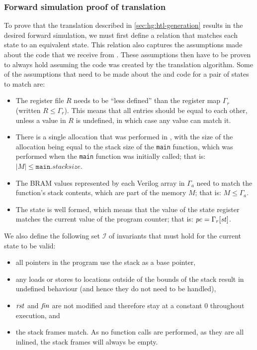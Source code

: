 \subsubsection{Forward simulation proof of translation}

To prove that the translation described in \cref{sec:hg:htl-generation} results
in the desired forward simulation, we must first define a relation that matches
each \rtlsubpar{} state to an equivalent \htl{} state.  This relation also
captures the assumptions made about the \rtlsubpar{} code that we receive from
\compcert{}.  These assumptions then have to be proven to always hold assuming
the \htl{} code was created by the translation algorithm.  Some of the
assumptions that need to be made about the \rtlsubpar{} and \htl{} code for a
pair of states to match are:

\begin{itemize}
\item The \rtlsubpar{} register file $R$ needs to be \enquote{less defined} than
  the \htl{} register map $\Gamma_{r}$ (written $R \le \Gamma_{r}$). This means
  that all entries should be equal to each other, unless a value in $R$ is
  undefined, in which case any value can match it.
\item There is a single allocation that was performed in \rtlsubpar{}, with the
  size of the allocation being equal to the stack size of the \texttt{main}
  function, which was performed when the \texttt{main} function was initially
  called; that is: $|M| \le \texttt{main}.\mathit{stacksize}$.
\item The \gls{BRAM} values represented by each Verilog array in $\Gamma_{a}$ need to
  match the \rtlsubpar{} function's stack contents, which are part of the memory $M$;
  that is: $M \le \Gamma_{a}$.
\item The state is well formed, which means that the value of the state register
  matches the current value of the program counter; that is:
  $\mathit{pc} = \Gamma_{r}[\mathit{st}]$.
\end{itemize}

We also define the following set $\mathcal{I}$ of invariants that must hold for
the current state to be valid:

\begin{itemize}
\item all pointers in the program use the stack as a base pointer,
\item any loads or stores to locations outside of the bounds of the stack result
  in undefined behaviour (and hence they do not need to be handled),
\item $\mathit{rst}$ and $\mathit{fin}$ are not modified and therefore stay at a
  constant 0 throughout execution, and
\item the stack frames match.  As no function calls are performed, as they are
  all inlined, the stack frames will always be empty.
\end{itemize}

